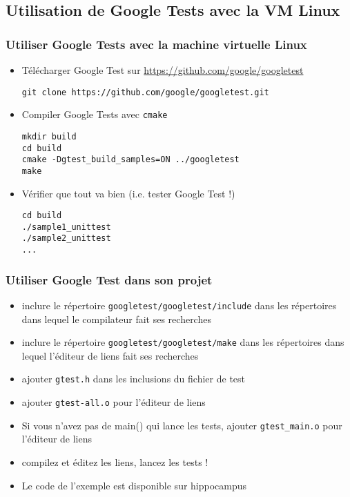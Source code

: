\subsection{Utilisation de Google Tests avec la VM Linux}

\begin{frame}[fragile]
\frametitle{Utiliser Google Tests avec la machine virtuelle Linux}
\begin{itemize}
\item Télécharger Google Test sur \url{https://github.com/google/googletest}
\begin{lstlisting}
git clone https://github.com/google/googletest.git
\end{lstlisting}
\item Compiler Google Tests avec \texttt{cmake}
\begin{lstlisting}
mkdir build
cd build
cmake -Dgtest_build_samples=ON ../googletest
make
\end{lstlisting}
\item Vérifier que tout va bien (i.e. tester Google Test !)
\begin{lstlisting}
cd build
./sample1_unittest
./sample2_unittest
...
\end{lstlisting}
\end{itemize}
\end{frame}

\begin{frame}[fragile]
\frametitle{Utiliser Google Test dans son projet}
\begin{itemize}
\item inclure le répertoire \texttt{googletest/googletest/include} dans les répertoires dans lequel le compilateur fait ses recherches
\item inclure le répertoire \texttt{googletest/googletest/make} dans les répertoires dans lequel l'éditeur de liens fait ses recherches
\item ajouter \texttt{gtest.h} dans les inclusions du fichier de test
\item ajouter \texttt{gtest-all.o} pour l'éditeur de liens
\item Si vous n'avez pas de main() qui lance les tests, ajouter \texttt{gtest\_main.o} pour l'éditeur de liens
\item compilez et éditez les liens, lancez les tests !
\item Le code de l'exemple est disponible sur hippocampus
\end{itemize}
\end{frame}


